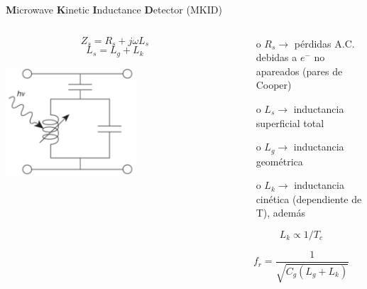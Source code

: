 \documentclass[ignorenonframetext,12pt]{beamer}
\begin{document}
\begin{frame}{\textbf{M}icrowave \textbf{K}inetic \textbf{I}nductance
	\textbf{D}etector (MKID)}
	\begin{columns}
		\begin{column}{0.49\textwidth}
			\begin{equation*}
				Z_s = R_s + j \omega L_s
			\end{equation*}
			\begin{equation*}
				L_s = L_g + L_k
			\end{equation*}

			\flushleft	\includegraphics[width=0.6\textwidth]{LCR_mkid}
		\end{column}
		\begin{column}{0.59\textwidth}
			\begin{itemize}
				\item[o] $R_s \to$ pérdidas A.C. debidas a $e^-$ no apareados
					(pares de Cooper)
				\item[o] $L_s \to$ inductancia superficial total
				\item[o] $L_g \to$ inductancia geométrica
				\item[o] $L_k \to$ inductancia cinética
					({\color{blue}dependiente de T}), además
			\end{itemize}

			\begin{equation*}
				L_k \propto 1/T_c
			\end{equation*}

			\begin{equation*}
				f_r = \frac{1}{\sqrt{C_g(L_g + L_k)}}
			\end{equation*}
		\end{column}
	\end{columns}
\end{frame}
\end{document}
